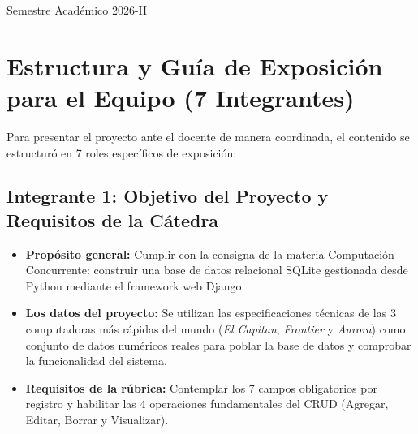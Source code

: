 \documentclass[11pt,a4paper]{article}
\begin{document}
\begin{titlepage}
    \vfill
    
    \begin{center}
    \end{center}
    
    \vspace{0.8cm}
    {\small Semestre Académico 2026-II}
\end{titlepage}

\tableofcontents
\newpage

\section{Estructura y Guía de Exposición para el Equipo (7 Integrantes)}

Para presentar el proyecto ante el docente de manera coordinada, el contenido se estructuró en 7 roles específicos de exposición:

\subsection{Integrante 1: Objetivo del Proyecto y Requisitos de la Cátedra}
\begin{itemize}
    \item \textbf{Propósito general:} Cumplir con la consigna de la materia Computación Concurrente: construir una base de datos relacional SQLite gestionada desde Python mediante el framework web Django.
    \item \textbf{Los datos del proyecto:} Se utilizan las especificaciones técnicas de las 3 computadoras más rápidas del mundo (\textit{El Capitan}, \textit{Frontier} y \textit{Aurora}) como conjunto de datos numéricos reales para poblar la base de datos y comprobar la funcionalidad del sistema.
    \item \textbf{Requisitos de la rúbrica:} Contemplar los 7 campos obligatorios por registro y habilitar las 4 operaciones fundamentales del CRUD (Agregar, Editar, Borrar y Visualizar).
\end{itemize}
\end{document}
